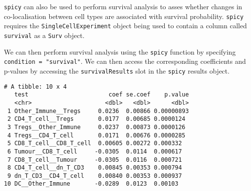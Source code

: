 \documentclass[
  letterpaper,
  DIV=11,
  numbers=noendperiod]{scrreprt}
\newenvironment{Shaded}{\begin{snugshade}}{\end{snugshade}}
\newcommand{\AttributeTok}[1]{\textcolor[rgb]{0.40,0.45,0.13}{#1}}
\newcommand{\CommentTok}[1]{\textcolor[rgb]{0.37,0.37,0.37}{#1}}
\newcommand{\DecValTok}[1]{\textcolor[rgb]{0.68,0.00,0.00}{#1}}
\newcommand{\FunctionTok}[1]{\textcolor[rgb]{0.28,0.35,0.67}{#1}}
\newcommand{\NormalTok}[1]{\textcolor[rgb]{0.00,0.23,0.31}{#1}}
\newcommand{\OtherTok}[1]{\textcolor[rgb]{0.00,0.23,0.31}{#1}}
\newcommand{\SpecialCharTok}[1]{\textcolor[rgb]{0.37,0.37,0.37}{#1}}
\newcommand{\StringTok}[1]{\textcolor[rgb]{0.13,0.47,0.30}{#1}}
\begin{document}
\texttt{spicy} can also be used to perform survival analysis to asses
whether changes in co-localisation between cell types are associated
with survival probability. \texttt{spicy} requires the
\texttt{SingleCellExperiment} object being used to contain a column
called \texttt{survival} as a \texttt{Surv} object.

\begin{Shaded}
\end{Shaded}

We can then perform survival analysis using the \texttt{spicy} function
by specifying \texttt{condition\ =\ "survival"}. We can then access the
corresponding coefficients and p-values by accessing the
\texttt{survivalResults} slot in the \texttt{spicy} results object.

\begin{Shaded}
\end{Shaded}

\begin{verbatim}
# A tibble: 10 x 4
   test                       coef se.coef    p.value
   <chr>                     <dbl>   <dbl>      <dbl>
 1 Other_Immune__Tregs     0.0236  0.00866 0.00000893
 2 CD4_T_cell__Tregs       0.0177  0.00685 0.0000124 
 3 Tregs__Other_Immune     0.0237  0.00873 0.0000126 
 4 Tregs__CD4_T_cell       0.0171  0.00676 0.0000285 
 5 CD8_T_cell__CD8_T_cell  0.00605 0.00272 0.000332  
 6 Tumour__CD8_T_cell     -0.0305  0.0114  0.000617  
 7 CD8_T_cell__Tumour     -0.0305  0.0116  0.000721  
 8 CD4_T_cell__dn_T_CD3    0.00845 0.00353 0.000794  
 9 dn_T_CD3__CD4_T_cell    0.00840 0.00353 0.000937  
10 DC__Other_Immune       -0.0289  0.0123  0.00103   
\end{verbatim}
\end{document}
